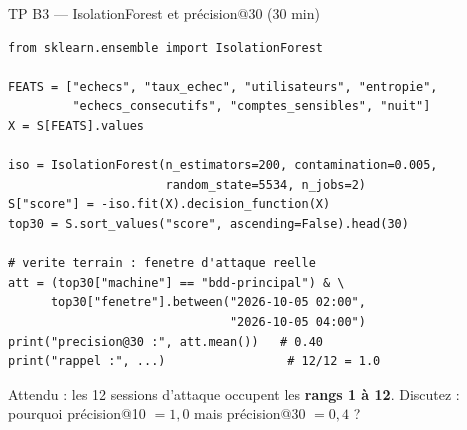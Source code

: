 \begin{frame}[fragile]{TP B3 --- IsolationForest et précision@30 (30 min)}
\footnotesize%
\begin{codebox}
\begin{lstlisting}
from sklearn.ensemble import IsolationForest

FEATS = ["echecs", "taux_echec", "utilisateurs", "entropie",
         "echecs_consecutifs", "comptes_sensibles", "nuit"]
X = S[FEATS].values

iso = IsolationForest(n_estimators=200, contamination=0.005,
                      random_state=5534, n_jobs=2)
S["score"] = -iso.fit(X).decision_function(X)
top30 = S.sort_values("score", ascending=False).head(30)

# verite terrain : fenetre d'attaque reelle
att = (top30["machine"] == "bdd-principal") & \
      top30["fenetre"].between("2026-10-05 02:00",
                               "2026-10-05 04:00")
print("precision@30 :", att.mean())   # 0.40
print("rappel :", ...)                 # 12/12 = 1.0
\end{lstlisting}
\end{codebox}
\vspace{1mm}
\begin{center}\small
Attendu : les 12 sessions d'attaque occupent les \textbf{rangs 1 à 12}.
Discutez : pourquoi précision@10 $= 1{,}0$ mais précision@30 $= 0{,}4$ ?
\end{center}
\end{frame}

